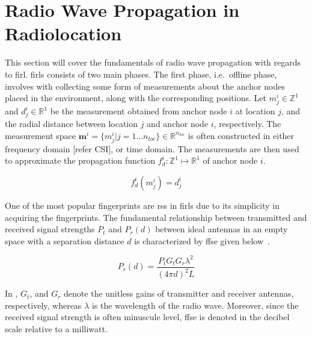 \section{Radio Wave Propagation in Radiolocation}
\label{sec:fundamentals}
    This section will cover the fundamentals of radio wave propagation with regards to \gls{firl}.
    \Gls{firl}s consists of two main phases.
    The first phase, i.e.\ offline phase,  involves with collecting some form of measurements about the anchor nodes placed in the environment, along with the corresponding positions.
    Let $m^i_j \in \mathbb{Z}^1$ and $d^i_j \in \mathbb{R}^1$ be the measurement obtained from anchor node $i$ at  location $j$, and the radial distance between location $j$ and anchor node $i$, respectively.
    The measurement space $\bm{m}^i=\{m^i_j | j=1 \ldots n_{loc}\} \in \mathbb{R}^{n_{loc}}$ is often constructed in either frequency domain [refer CSI], or time domain.
    The measurements are then used to approximate the propagation function $f^i_d:\mathbb{Z}^1\mapsto\mathbb{R}^1$ of anchor node $i$.

    \begin{equation}
        f^i_d(m^i_j)=d^i_j
    \end{equation}

    One of the most popular fingerprints are \gls{rss} in \gls{firl}s due to its simplicity in acquiring the fingerprints.
    The fundamental relationship between transmitted and received signal strengths $P_t$ and $P_r(d)$ between ideal antennas in an empty space with a separation distance $d$ is characterized by \gls{ffse} given below~\cite{friis1946note}.

    \begin{equation}
        \label{eq:friisWatts}
            P_r(d) = \dfrac{P_t  G_t  G_r \lambda^2}{{\left(4 \pi d\right)}^2 L}
    \end{equation}

    In , $G_t$, and $G_r$ denote the unitless gains of transmitter and receiver antennas, respectively, whereas $\lambda$ is the wavelength of the radio wave.
    Moreover, since the received signal strength is often minuscule level, \gls{ffse} is denoted in the decibel scale relative to a milliwatt.

